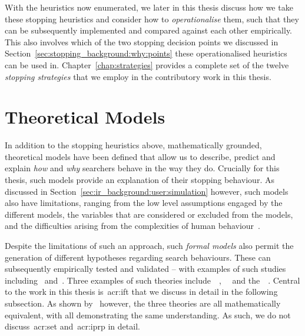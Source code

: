 With the heuristics now enumerated, we later in this thesis discuss how we take these stopping heuristics and consider how to \emph{operationalise} them, such that they can be subsequently implemented and compared against each other empirically. This also involves which of the two stopping decision points we discussed in Section~\ref{sec:stopping_background:why:points} these operationalised heuristics can be used in. Chapter~\ref{chap:strategies} provides a complete set of the twelve \emph{stopping strategies} that we employ in the contributory work in this thesis.

\section{Theoretical Models}\label{sec:stopping_background:theoretical}
In addition to the stopping heuristics above, mathematically grounded, theoretical models have been defined that allow us to describe, predict and explain \emph{how} and \emph{why} searchers behave in the way they do. Crucially for this thesis, such models provide an explanation of their stopping behaviour. As discussed in Section~\ref{sec:ir_background:user:simulation} however, such models also have limitations, ranging from the low level assumptions engaged by the different models, the variables that are considered or excluded from the models, and the difficulties arising from the complexities of human behaviour~\citep{fishwick1995simulation, azzopardi2015theories}.

Despite the limitations of such an approach, such \emph{formal models} also permit the generation of different hypotheses regarding search behaviours. These can subsequently empirically tested and validated -- with examples of such studies including~\cite{azzopardi2013query_cost} and~\cite{pirolli1996scatter_techniques}. Three examples of such theories include~~\citep{pirolli1999ift},~~\citep{azzopardi2011economics} and the~~\citep{fuhr2008iprp}. Central to the work in this thesis is~\gls{acr:ift} that we discuss in detail in the following subsection. As shown by~\cite{azzopardi2015theories} however, the three theories are all mathematically equivalent, with all demonstrating the same understanding. As such, we do not discuss~\gls{acr:set} and~\gls{acr:iprp} in detail.


